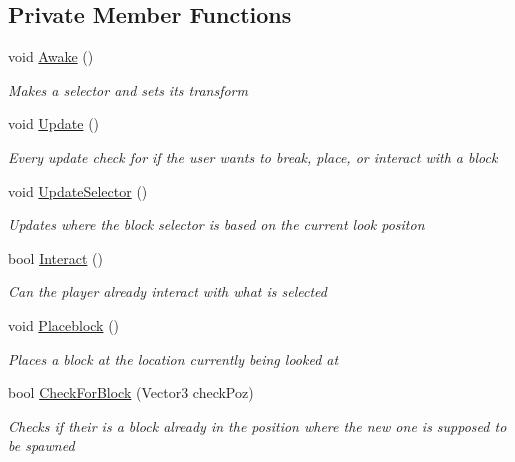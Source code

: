 \subsection*{Private Member Functions}
\begin{DoxyCompactItemize}
\item 
void \hyperlink{class_bee_game_1_1_player_1_1_player_interact_a8f1c9ab307b82d47066e0d93f27bddbc}{Awake} ()
\begin{DoxyCompactList}\small\item\em Makes a selector and sets it\textquotesingle{}s transform \end{DoxyCompactList}\item 
void \hyperlink{class_bee_game_1_1_player_1_1_player_interact_a795e661cbe900f8a46f8d8667ec43474}{Update} ()
\begin{DoxyCompactList}\small\item\em Every update check for if the user wants to break, place, or interact with a block \end{DoxyCompactList}\item 
void \hyperlink{class_bee_game_1_1_player_1_1_player_interact_a22c84b1a000dbc8775eb9e9d396f26ff}{Update\+Selector} ()
\begin{DoxyCompactList}\small\item\em Updates where the block selector is based on the current look positon \end{DoxyCompactList}\item 
bool \hyperlink{class_bee_game_1_1_player_1_1_player_interact_a47059ea03d8b16b406ed5218c52198a3}{Interact} ()
\begin{DoxyCompactList}\small\item\em Can the player already interact with what is selected \end{DoxyCompactList}\item 
void \hyperlink{class_bee_game_1_1_player_1_1_player_interact_a55ce2fd36c1120aed30893502f1e909f}{Placeblock} ()
\begin{DoxyCompactList}\small\item\em Places a block at the location currently being looked at \end{DoxyCompactList}\item 
bool \hyperlink{class_bee_game_1_1_player_1_1_player_interact_a74a5e5d022edcbc28ab6956cbc8266c8}{Check\+For\+Block} (Vector3 check\+Poz)
\begin{DoxyCompactList}\small\item\em Checks if their is a block already in the position where the new one is supposed to be spawned \end{DoxyCompactList}\item 

\end{DoxyCompactItemize}
